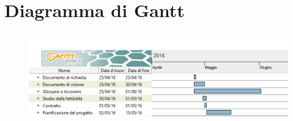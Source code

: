 \section{Diagramma di Gantt}
\label{sec:diagramma_di_gantt}
\begin{figure}
\begin{center}
	\includegraphics[width=\textwidth]{diagrammaGantt/DiagrammaGantt}
\end{center}
\end{figure}
